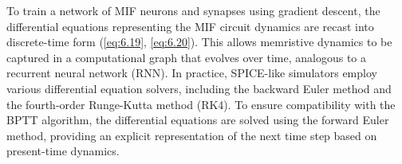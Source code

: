 

\noindent To train a network of MIF neurons and synapses using gradient descent, the differential equations representing the MIF circuit dynamics are recast into discrete-time form (\ref{eq:6.19}, \ref{eq:6.20}). This allows memristive dynamics to be captured in a computational graph that evolves over time, analogous to a recurrent neural network (RNN). In practice, SPICE-like simulators employ various differential equation solvers, including the backward Euler method and the fourth-order Runge-Kutta method (RK4). To ensure compatibility with the BPTT algorithm, the differential equations are solved using the forward Euler method, providing an explicit representation of the next time step based on present-time dynamics. \\



